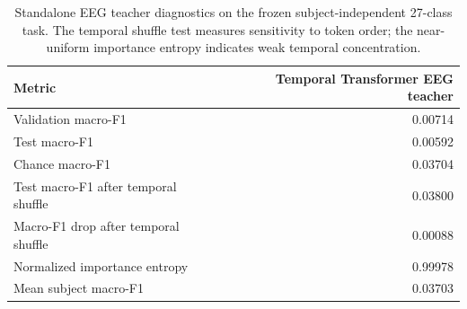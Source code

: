 
\begin{table}[t]
\centering
\caption{Standalone EEG teacher diagnostics on the frozen subject-independent
27-class task. The temporal shuffle test measures sensitivity to token order;
the near-uniform importance entropy indicates weak temporal concentration.}
\label{tab:eeg_teacher}
\begin{tabular}{lr}
\toprule
Metric & Temporal Transformer EEG teacher\\
\midrule
Validation macro-F1 & 0.00714\\
Test macro-F1 & 0.00592\\
Chance macro-F1 & 0.03704\\
Test macro-F1 after temporal shuffle & 0.03800\\
Macro-F1 drop after temporal shuffle & 0.00088\\
Normalized importance entropy & 0.99978\\
Mean subject macro-F1 & 0.03703\\
\bottomrule
\end{tabular}
\end{table}
